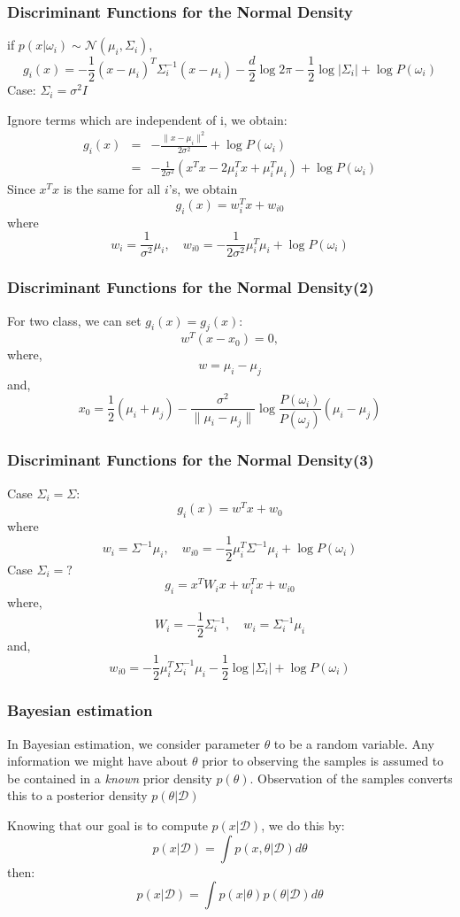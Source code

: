 \documentclass[slidestop,compress,mathserif]{beamer}
\begin{document}
    \begin{frame}[shrink]
    	\frametitle{Discriminant Functions for the Normal Density}
    	if $p(x|\omega_i) \sim \mathcal{N}(\mu_i,\Sigma_i)$,
    	$$g_i(x)=-\frac{1}{2}(x-\mu_i)^T\Sigma_i^{-1}(x-\mu_i)-\frac{d}{2}\log 2\pi - \frac{1}{2}\log |\Sigma_i|+\log P(\omega_i)$$
    	Case: $\Sigma_i = \sigma^2I$
    	
    	Ignore terms which are independent of i, we obtain:
    	\begin{eqnarray*}
    		g_i(x) &=& -\frac{\|x-\mu_i\|^2}{2\sigma^2}+\log P(\omega_i)\\
    		&=& -\frac{1}{2\sigma^2}(x^Tx-2\mu_i^Tx+\mu_i^T\mu_i)+\log P(\omega_i)
    	\end{eqnarray*}
    	Since $x^Tx$ is the same for all $i$'s, we obtain
    	$$g_i(x) = w_i^Tx+w_{i0}$$
    	where
    	$$w_i=\frac{1}{\sigma^2}\mu_i,\quad w_{i0} = -\frac{1}{2\sigma^2}\mu_i^T\mu_i+\log P(\omega_i)$$
    \end{frame}
    \begin{frame}
    	\frametitle{Discriminant Functions for the Normal Density(2)}
    	For two class, we can set $g_i(x)=g_j(x)$:
    	$$w^T(x-x_0)=0,$$
    	where,
    	$$w = \mu_i-\mu_j$$
    	and,
    	$$x_0=\frac{1}{2}(\mu_i+\mu_j)-\frac{\sigma^2}{\|\mu_i-\mu_j\|}\log\frac{P(\omega_i)}{P(\omega_j)}(\mu_i-\mu_j)$$
    \end{frame}
    \begin{frame}
    	\frametitle{Discriminant Functions for the Normal Density(3)}
    	Case $\Sigma_i=\Sigma$:
    	$$g_i(x) = w^Tx + w_0$$
    	where
    	$$w_i=\Sigma^{-1}\mu_i,\quad w_{i0}=-\frac{1}{2}\mu_i^T\Sigma^{-1}\mu_i+\log P(\omega_i)$$
    	Case $\Sigma_i=?$
    	$$g_i=x^TW_ix+w_i^Tx+w_{i0}$$
    	where,
    	$$W_i=-\frac{1}{2}\Sigma_i^{-1},\quad w_i=\Sigma_i^{-1}\mu_i$$
    	and,
    	$$w_{i0}=-\frac{1}{2}\mu_i^T\Sigma_i^{-1}\mu_i-\frac{1}{2}\log |\Sigma_i| + \log P(\omega_i)$$
    \end{frame}
    \begin{frame}
    	\frametitle{Bayesian estimation}
    	In Bayesian estimation, we consider parameter $\theta$ to be a random variable. Any information we might have about $\theta$ prior to observing the samples is assumed to be contained in a \textit{known} prior density $p(\theta)$. Observation of the samples converts this to a posterior density $p(\theta|\mathcal{D})$
    	
    	Knowing that our goal is to  compute $p(x|\mathcal{D})$, we do this by:
    	$$p(x|\mathcal{D})=\int p(x,\theta|\mathcal{D})d\theta$$ 
    	then:
    	$$p(x|\mathcal{D}) = \int p(x|\theta)p(\theta|\mathcal{D})d\theta$$
    \end{frame}
\end{document}
